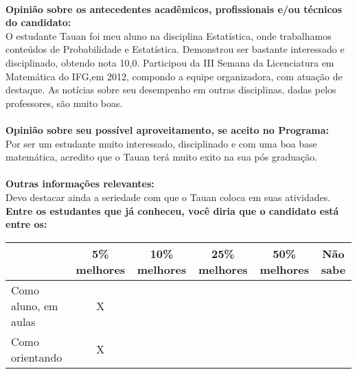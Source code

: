 \documentclass[11pt]{article}
\begin{document}
\\
\textbf{Opinião sobre os antecedentes acadêmicos, profissionais e/ou técnicos do candidato:}
\\O estudante Tauan foi meu aluno na disciplina Estatística, onde trabalhamos conteúdos de Probabilidade e Estatística. Demonstrou ser bastante interessado e disciplinado, obtendo nota 10,0. 
Participou da III Semana da Licenciatura em Matemática do IFG,em 2012, compondo a equipe organizadora, com atuação de destaque.
As notícias sobre seu desempenho em outras disciplinas, dadas pelos professores, são muito boas.\\
\\
\textbf{Opinião sobre seu possível aproveitamento, se aceito no Programa:}
\\Por ser um estudante muito interessado, disciplinado e com uma boa base matemática, acredito que o Tauan terá muito exito na sua pós graduação.\\ 
\\
\textbf{Outras informações relevantes:} \\Devo destacar ainda a seriedade com que o Tauan coloca em suas atividades.
\\[0.3cm]
\textbf{Entre os estudantes que já conheceu, você diria que o candidato está entre os:}
\\
\begin{tabular}{|l|c|c|c|c|c|}
\hline
 & 5\% melhores & 10\% melhores & 25\% melhores & 50\% melhores & Não sabe \\
\hline
Como aluno, em aulas & X &  &  &  & \\
\hline
Como orientando & X &  &  &  & \\
\hline
\end{tabular}
\end{document}

